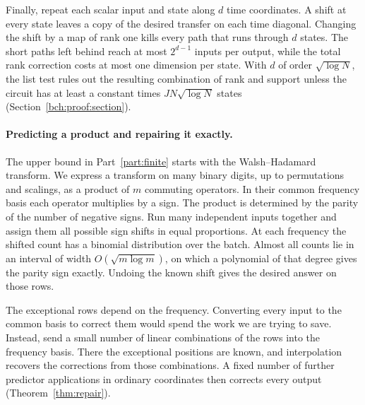 Finally, repeat each scalar input and state along $d$ time coordinates.
A shift at every state leaves a copy of the desired transfer on each
time diagonal. Changing the shift by a map of rank one kills every
path that runs through $d$ states. The short paths left behind reach
at most $2^{d-1}$ inputs per output, while the total rank correction
costs at most one dimension per state. With $d$ of order
$\sqrt{\log N}$, the list test rules out the resulting combination
of rank and support unless the circuit has at least a constant times $JN\sqrt{\log N}$
states (Section~\ref{bch:proof:section}).

\paragraph{Predicting a product and repairing it exactly.}
The upper bound in Part~\ref{part:finite} starts with the Walsh--Hadamard
transform. We express a transform on many binary digits, up to
permutations and scalings, as a product of $m$ commuting operators.
In their common frequency basis each operator multiplies by a sign.
The product is determined by the parity of the number of negative
signs. Run many independent inputs together and assign them all
possible sign shifts in equal proportions. At each frequency the
shifted count has a binomial distribution over the batch. Almost all
counts lie in an interval of width $O(\sqrt{m\log m})$, on which a
polynomial of that degree gives the parity sign exactly. Undoing the
known shift gives the desired answer on those rows.

The exceptional rows depend on the frequency. Converting every input
to the common basis to correct them would spend the work we are trying
to save. Instead, send a small number of linear combinations of the
rows into the frequency basis. There the exceptional positions are
known, and interpolation recovers the corrections from those combinations.
A fixed number of further predictor applications in ordinary
coordinates then corrects every output (Theorem~\ref{thm:repair}).

